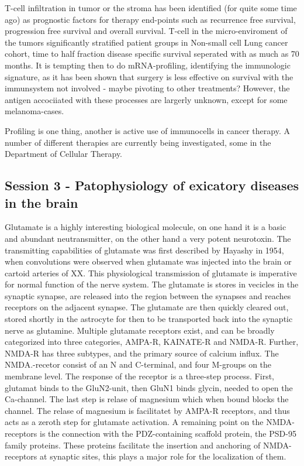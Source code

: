 \documentclass[12p]{article}
\begin{document}
T-cell infiltration in tumor or the stroma has been identified (for quite some time ago) as prognostic factors for therapy end-points such as recurrence free survival, progression free survival and overall survival.
T-cell in the micro-enviroment of the tumors significantly stratified patient groups in Non-small cell Lung cancer cohort, time to half fraction disease specific survival seperated with as much as 70 months.
It is tempting then to do mRNA-profiling, identifying the immunologic signature, as it has been shown that surgery is less effective on survival with the immunsystem not involved - maybe pivoting to other treatments?
However, the antigen accociiated with these processes are largerly unknown, except for some melanoma-cases.

Profiling is one thing, another is active use of immunocells in cancer therapy.
A number of different therapies are currently being investigated, some in the Department of Cellular Therapy.




\subsection*{Session 3 - Patophysiology of exicatory diseases in the brain}

Glutamate is a highly interesting biological molecule, on one hand it is a basic and abundant neutransmitter, on the other hand a very potent neurotoxin.
The transmitting capabilities of glutamate was first described by Hayashy in 1954, when convolutions were observed when glutamate was injected into the brain or cartoid arteries of XX.
This physiological transmission of glutamate is imperative for normal function of the nerve system.
The glutamate is stores in vecicles in the synaptic synapse, are released into the region between the synapses and reaches receptors on the adjacent synapse.
The glutamate are then quickly cleared out, stored shortly in the astrocyte for then to be transported back into the synaptic nerve as glutamine.
Multiple glutamate receptors exist, and can be broadly categorized into three categories, AMPA-R, KAINATE-R and NMDA-R.
Further, NMDA-R has three subtypes, and the primary source of calcium influx.
The NMDA.-recetor consist of an N and C-terminal, and four M-groups on the membrane level.
The response of the receptor is a three-step process.
First, glutamat binds to the GluN2-unit, then GluN1 binds glycin, needed to open the Ca-channel.
The last step is relase of magnesium which when bound blocks the channel.
The relase of magnesium is facilitatet by AMPA-R receptors, and thus acts as a zeroth step for glutamate activation.
A remaining point on the NMDA-receptors is the connection with the PDZ-containing scaffold protein, the PSD-95 family proteins.
These proteins facilitate the insertion and anchoring of NMDA-receptors at synaptic sites, this plays a major role for the localization of them.
\end{document}
